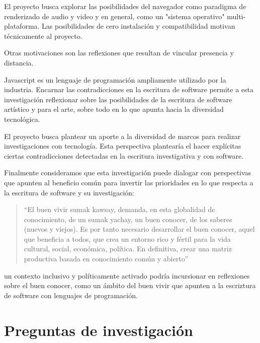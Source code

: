 El proyecto busca explorar las posibilidades del navegador como paradigma de renderizado de audio y video y en general, como un "sistema operativo" multi-plataforma. Las posibilidades de cero instalación y compatibilidad motivan técnicamente al proyecto.

Otras motivaciones son las reflexiones que resultan de vincular presencia y distancia.

Javascript es un lenguaje de programación ampliamente utilizado por la industria. Encarnar las contradicciones en la escritura de software permite a esta investigación reflexionar sobre las posibilidades de la escritura de software artístico y para el arte, sobre todo en lo que apunta hacia la diversidad tecnológica.

El proyecto busca plantear un aporte a la diversidad de marcos para realizar investigaciones con tecnología. Esta perspectiva plantearía el hacer explícitas ciertas contradicciones detectadas en la escritura investigativa y con software. 

Finalmente consideramos que esta investigación puede dialogar con perspectivas que apunten al beneficio común para invertir las prioridades en lo que respecta a la escritura de software y su investigación:

\begin{quote}

  ``El buen vivir sumak kawsay, demanda, en esta globalidad de conocimiento, de un sumak yachay, un buen conocer, de los saberes (nuevos y viejos). Es por tanto necesario desarrollar el buen conocer, aquel que beneficia a todos, que crea un entorno rico y fértil para la vida cultural, social, económica, política. En definitiva, crear una matriz productiva basada en conocimiento común y abierto''\citep[p.~31]{platohedro}

\end{quote}

un contexto inclusivo y políticamente activado podría incursionar en reflexiones sobre el buen conocer, como un ámbito del buen vivir que apunten a la escriztura de software con lenguajes de programación.  


\section{Preguntas de investigación} %


